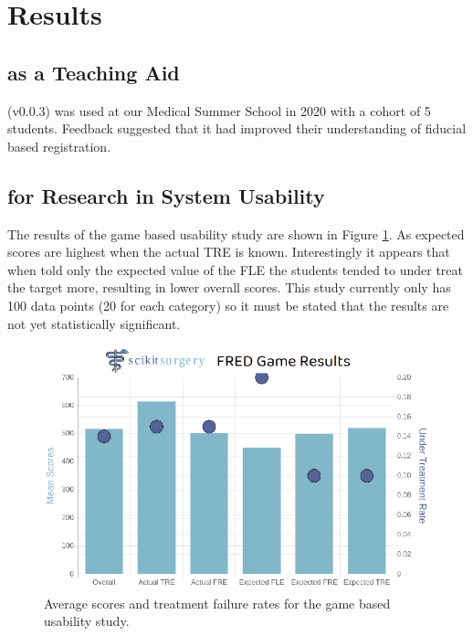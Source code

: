 \section{Results}
\subsection{\fred as a Teaching Aid}

\fred (v0.0.3)\cite{stephen_thompson_2020_3946090} was used at our Medical Summer School in 2020 with a cohort of 5 students. Feedback suggested that it had improved their understanding
of fiducial based registration. 

\subsection{\fred for Research in System Usability}
The results of the game based usability study are shown in Figure \ref{fig:usability}. As expected scores are 
highest when the actual \gls{TRE} is known. Interestingly it appears that when told only the expected value of the \gls{FLE} the students
tended to under treat the target more, resulting in lower overall scores. This study currently only has 100 data points (20 for each category)
so it must be stated that the results are not yet statistically significant. 

\begin{figure}
        \begin{center}
        \includegraphics[width=0.5\linewidth]{usability.eps}
                \caption{\label{fig:usability}Average scores and treatment failure rates for the game based usability study.}
	\end{center}
\end{figure}


